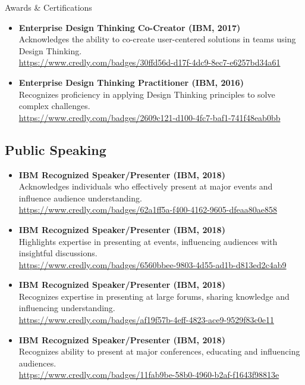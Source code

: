 \documentclass{resume} %
\begin{document}
\begin{rSection}{Awards \& Certifications}
\begin{itemize}
    \item \textbf{Enterprise Design Thinking Co-Creator (IBM, 2017)} \\
    Acknowledges the ability to co-create user-centered solutions in teams using Design Thinking. \\
    \url{https://www.credly.com/badges/30ffd56d-d17f-4dc9-8ec7-e6257bd34a61}
    
    \item \textbf{Enterprise Design Thinking Practitioner (IBM, 2016)} \\
    Recognizes proficiency in applying Design Thinking principles to solve complex challenges. \\
    \url{https://www.credly.com/badges/2609c121-d100-4fc7-baf1-741f48eab0bb}
\end{itemize}

\subsection*{Public Speaking}

\begin{itemize}
    \item \textbf{IBM Recognized Speaker/Presenter (IBM, 2018)} \\
    Acknowledges individuals who effectively present at major events and influence audience understanding. \\
    \url{https://www.credly.com/badges/62a1ff5a-f400-4162-9605-dfeaa80ae858}
    
    \item \textbf{IBM Recognized Speaker/Presenter (IBM, 2018)} \\
    Highlights expertise in presenting at events, influencing audiences with insightful discussions. \\
    \url{https://www.credly.com/badges/6560bbee-9803-4d55-ad1b-d813ed2c4ab9}
    
    \item \textbf{IBM Recognized Speaker/Presenter (IBM, 2018)} \\
    Recognizes expertise in presenting at large forums, sharing knowledge and influencing understanding. \\
    \url{https://www.credly.com/badges/af19f57b-4eff-4823-ace9-9529f83c0e11}
    
    \item \textbf{IBM Recognized Speaker/Presenter (IBM, 2018)} \\
    Recognizes ability to present at major conferences, educating and influencing audiences. \\
    \url{https://www.credly.com/badges/11fab9be-58b0-4960-b2af-f1643f98813e}
    

\end{itemize}
\end{rSection}
\end{document}

